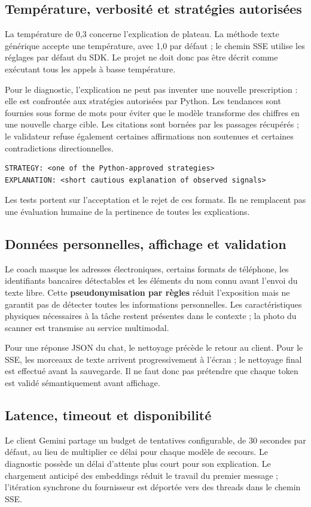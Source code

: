 \documentclass[11pt,a4paper]{article}
\begin{document}
\clearpage
\subsection{Température, verbosité et stratégies autorisées}
La température de 0,3 concerne l'explication de plateau. La méthode texte générique accepte une température, avec 1,0 par défaut ; le chemin SSE utilise les réglages par défaut du SDK. Le projet ne doit donc pas être décrit comme exécutant tous les appels à basse température.

Pour le diagnostic, l'explication ne peut pas inventer une nouvelle prescription : elle est confrontée aux stratégies autorisées par Python. Les tendances sont fournies sous forme de mots pour éviter que le modèle transforme des chiffres en une nouvelle charge cible. Les citations sont bornées par les passages récupérés ; le validateur refuse également certaines affirmations non soutenues et certaines contradictions directionnelles.

\begin{lstlisting}[caption={Structure de la sortie du diagnostic, exemple de format uniquement}]
STRATEGY: <one of the Python-approved strategies>
EXPLANATION: <short cautious explanation of observed signals>
\end{lstlisting}
Les tests portent sur l'acceptation et le rejet de ces formats. Ils ne remplacent pas une évaluation humaine de la pertinence de toutes les explications.

\subsection{Données personnelles, affichage et validation}
Le coach masque les adresses électroniques, certains formats de téléphone, les identifiants bancaires détectables et les éléments du nom connu avant l'envoi du texte libre. Cette \textbf{pseudonymisation par règles} réduit l'exposition mais ne garantit pas de détecter toutes les informations personnelles. Les caractéristiques physiques nécessaires à la tâche restent présentes dans le contexte ; la photo du scanner est transmise au service multimodal.

Pour une réponse JSON du chat, le nettoyage précède le retour au client. Pour le SSE, les morceaux de texte arrivent progressivement à l'écran ; le nettoyage final est effectué avant la sauvegarde. Il ne faut donc pas prétendre que chaque token est validé sémantiquement avant affichage.

\subsection{Latence, timeout et disponibilité}
Le client Gemini partage un budget de tentatives configurable, de 30 secondes par défaut, au lieu de multiplier ce délai pour chaque modèle de secours. Le diagnostic possède un délai d'attente plus court pour son explication. Le chargement anticipé des embeddings réduit le travail du premier message ; l'itération synchrone du fournisseur est déportée vers des threads dans le chemin SSE.
\end{document}
